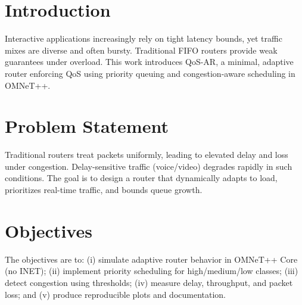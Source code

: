 \documentclass[12pt]{article}
\begin{document}
\clearpage
{}

\tableofcontents
\listoffigures
\clearpage

\begin{abstract}
Quality-of-service (QoS) guarantees for heterogeneous traffic are challenging under variable and bursty loads. I present QoS-AR, a lightweight, QoS-aware software router for OMNeT++ that prioritizes delay-sensitive flows while adapting to congestion. QoS-AR classifies traffic into voice, video, and data, monitors queue occupancy, and switches scheduling modes when thresholds are crossed. Under congestion, the router protects real-time traffic by elevating priority and selectively dropping low-priority packets. Evaluation across Light, Mixed, Heavy, and Congested scenarios demonstrates reduced delay for voice and video and controlled queue growth. QoS-AR offers a practical balance between latency protection and fairness, delivering consistent QoS without heavyweight dependencies.
\end{abstract}

\section{Introduction}
Interactive applications increasingly rely on tight latency bounds, yet traffic mixes are diverse and often bursty. Traditional FIFO routers provide weak guarantees under overload. This work introduces QoS-AR, a minimal, adaptive router enforcing QoS using priority queuing and congestion-aware scheduling in OMNeT++.

\section{Problem Statement}
Traditional routers treat packets uniformly, leading to elevated delay and loss under congestion. Delay-sensitive traffic (voice/video) degrades rapidly in such conditions. The goal is to design a router that dynamically adapts to load, prioritizes real-time traffic, and bounds queue growth.

\section{Objectives}
The objectives are to: (i) simulate adaptive router behavior in OMNeT++ Core (no INET); (ii) implement priority scheduling for high/medium/low classes; (iii) detect congestion using thresholds; (iv) measure delay, throughput, and packet loss; and (v) produce reproducible plots and documentation.
\end{document}
